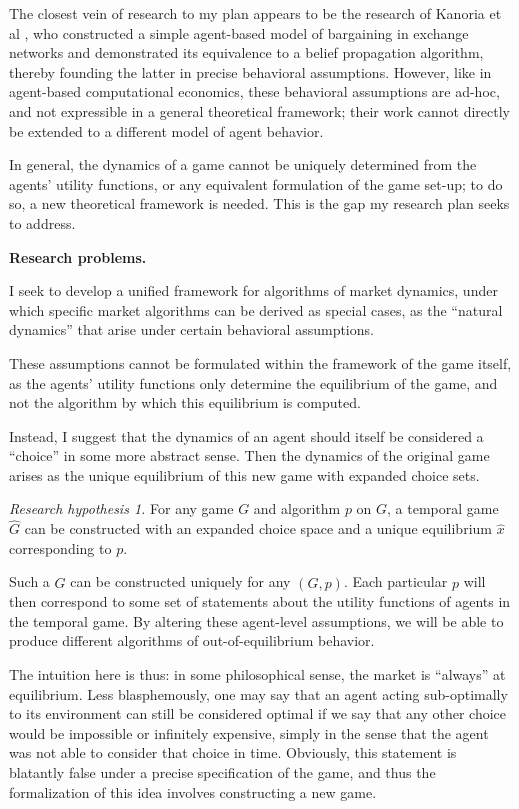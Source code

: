 \documentclass{article}
\newcommand{\statement}[1]{\par\medskip
  {\textbf{#1.}}\space
}
\newcommand{\substatement}[1]{\par\medskip
  {\emph{#1.}}\space
}
\begin{document}
The closest vein of research to my plan appears to be the research of Kanoria et al \cite{bayati1, bayati2, bayati3}, who constructed a simple agent-based model of bargaining in exchange networks and demonstrated its equivalence to a belief propagation algorithm, thereby founding the latter in precise behavioral assumptions. However, like in agent-based computational economics, these behavioral assumptions are ad-hoc, and not expressible in a general theoretical framework; their work cannot directly be extended to a different model of agent behavior.

In general, the dynamics of a game cannot be uniquely determined from the agents' utility functions, or any equivalent formulation of the game set-up; to do so, a new theoretical framework is needed. This is the gap my research plan seeks to address.

\statement{Research problems}

I seek to develop a unified framework for algorithms of market dynamics, under which specific market algorithms can be derived as special cases, as the ``natural dynamics'' that arise under certain behavioral assumptions. 

These assumptions cannot be formulated within the framework of the game itself, as the agents' utility functions only determine the equilibrium of the game, and not the algorithm by which this equilibrium is computed. 

Instead, I suggest that the dynamics of an agent should itself be considered a ``choice'' in some more abstract sense. Then the dynamics of the original game arises as the unique equilibrium of this new game with expanded choice sets. 

\substatement{Research hypothesis 1} For any game $G$ and algorithm $p$ on $G$, a temporal game $\hat{G}$ can be constructed with an expanded choice space and a unique equilibrium $\hat{x}$ corresponding to $p$. 

\par\medskip

Such a $\hat{G}$ can be constructed uniquely for any $(G, p)$. Each particular $p$ will then correspond to some set of statements about the utility functions of agents in the temporal game. By altering these agent-level assumptions, we will be able to produce different algorithms of out-of-equilibrium behavior.

The intuition here is thus: in some philosophical sense, the market is ``always'' at equilibrium. Less blasphemously, one may say that an agent acting sub-optimally to its environment can still be considered optimal if we say that any other choice would be impossible or infinitely expensive, simply in the sense that the agent was not able to consider that choice in time. Obviously, this statement is blatantly false under a precise specification of the game, and thus the formalization of this idea involves constructing a new game.
\end{document}
